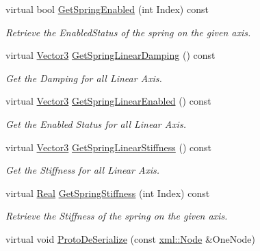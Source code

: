 \begin{DoxyCompactItemize}
virtual bool \hyperlink{classphys_1_1Generic6DofSpringConstraint_a921afe66b38b967e666c53a8448d4a00}{GetSpringEnabled} (int Index) const 
\begin{DoxyCompactList}\small\item\em Retrieve the EnabledStatus of the spring on the given axis. \item\end{DoxyCompactList}\item 
virtual \hyperlink{classphys_1_1Vector3}{Vector3} \hyperlink{classphys_1_1Generic6DofSpringConstraint_ab58b5111016f4f29343b0097848de2d2}{GetSpringLinearDamping} () const 
\begin{DoxyCompactList}\small\item\em Get the Damping for all Linear Axis. \item\end{DoxyCompactList}\item 
virtual \hyperlink{classphys_1_1Vector3}{Vector3} \hyperlink{classphys_1_1Generic6DofSpringConstraint_abc9670d0ca5631994b0e260428ee1110}{GetSpringLinearEnabled} () const 
\begin{DoxyCompactList}\small\item\em Get the Enabled Status for all Linear Axis. \item\end{DoxyCompactList}\item 
virtual \hyperlink{classphys_1_1Vector3}{Vector3} \hyperlink{classphys_1_1Generic6DofSpringConstraint_a2ef04c27d4340bb41233129e387b1145}{GetSpringLinearStiffness} () const 
\begin{DoxyCompactList}\small\item\em Get the Stiffness for all Linear Axis. \item\end{DoxyCompactList}\item 
virtual \hyperlink{namespacephys_af7eb897198d265b8e868f45240230d5f}{Real} \hyperlink{classphys_1_1Generic6DofSpringConstraint_a06d43edcb68aa820060a60b49387f9e6}{GetSpringStiffness} (int Index) const 
\begin{DoxyCompactList}\small\item\em Retrieve the Stiffness of the spring on the given axis. \item\end{DoxyCompactList}\item 
virtual void \hyperlink{classphys_1_1Generic6DofSpringConstraint_aa92969027509290efc128334b01db500}{ProtoDeSerialize} (const \hyperlink{classphys_1_1xml_1_1Node}{xml::Node} \&OneNode)

\end{DoxyCompactItemize}
